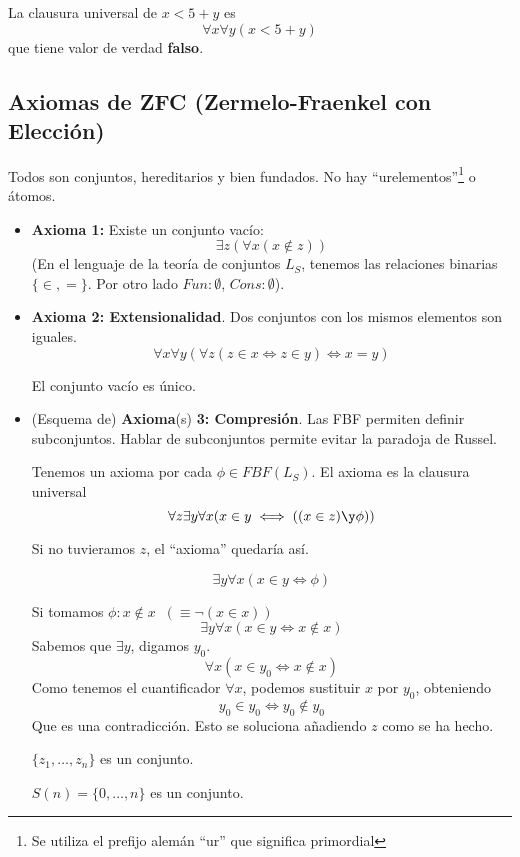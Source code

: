 \begin{example}
	La clausura universal de $x < 5 + y$ es $$\forall x\forall y (x < 5 + y)$$ que tiene valor de verdad \textbf{falso}.
\end{example}

\subsection{Axiomas de ZFC (Zermelo-Fraenkel con Elección)}
	Todos son conjuntos, hereditarios y bien fundados.
	No hay ``urelementos''\footnote{Se utiliza el prefijo alemán ``ur'' que significa primordial} o átomos.
	\begin{itemize}
		\item \textbf{Axioma 1:} Existe un conjunto vacío:
		$$\exists z (\forall x (x\notin z))$$
		(En el lenguaje de la teoría de conjuntos $L_S$, tenemos las relaciones binarias $\{\in, =\}$. Por otro lado $Fun: \emptyset$, $Cons: \emptyset$).
		\item \textbf{Axioma 2: Extensionalidad}.
		Dos conjuntos con los mismos elementos son iguales.
		$$\forall x\forall y(\forall z (z\in x\iff z\in y)\iff x = y)$$
		\begin{corol}
			El conjunto vacío es único.
		\end{corol}
		
		\item (Esquema de) \textbf{Axioma}(s) \textbf{3: Compresión}. Las FBF permiten definir subconjuntos. Hablar de subconjuntos permite evitar la paradoja de Russel.
		
		Tenemos un axioma por cada $\phi\in FBF(L_S)$. El axioma es la clausura universal
		$$\forall z \exists y \forall x(x\in y\iff((x\in z)\y \phi))$$
		
		Si no tuvieramos $z$, el ``axioma'' quedaría así.
		
		$$\exists y \forall x (x\in y\iff \phi)$$
		
		Si tomamos $\phi: x\notin x \;\; (\equiv\neg (x\in x))$
		$$\exists y \forall x (x\in y\iff x\notin x)$$
		Sabemos que $\exists y$, digamos $y_0$.
		$$\forall x (x\in y_0 \iff x\notin x)$$ 
		Como tenemos el cuantificador $\forall x$, podemos sustituir $x$ por $y_0$, obteniendo
		$$y_0\in y_0 \iff y_0\notin y_0$$
		Que es una contradicción. Esto se soluciona añadiendo $z$ como se ha hecho.
		
		\begin{obs}
			$\{z_1,\hdots, z_n\}$ es un conjunto.
			
			$S(n) = \{0, \hdots, n\}$ es un conjunto.
			

\end{obs}
\end{itemize}
